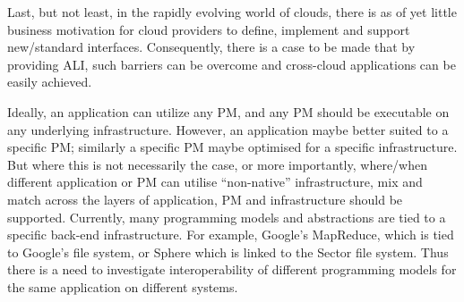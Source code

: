 \documentclass[3p,twocolumn]{elsarticle}
\begin{document}
Last, but not least, in the rapidly evolving world of clouds, there is
as of yet little business motivation for cloud providers to define,
implement and support new/standard interfaces. Consequently, there is
a case to be made that by providing ALI, such barriers can be overcome
and cross-cloud applications can be easily achieved.
 
Ideally, an application can utilize any PM, and any PM should be
executable on any underlying infrastructure. However, an application
maybe better suited to a specific PM; similarly a specific PM maybe
optimised for a specific infrastructure. But where this is not
necessarily the case, or more importantly, where/when different
application or PM can utilise ``non-native'' infrastructure, mix and
match across the layers of application, PM and infrastructure should
be supported.  Currently, many programming models and abstractions are
tied to a specific back-end infrastructure.  For example, Google's
MapReduce, which is tied to Google's file system, or
Sphere\cite{sectorsphere09} which is linked to the Sector file
system. Thus there is a need to investigate interoperability of
different programming models for the same application on different
systems.



 


\end{document}
